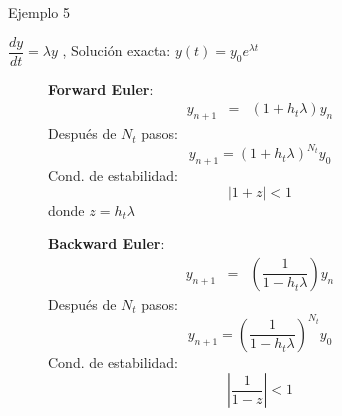 \documentclass{beamer}
\begin{document}
\begin{frame}{Ejemplo 5}

\begin{block}{}
$\dfrac{dy}{dt} = \lambda y$ , Solución exacta: $y(t) = y_0 e^{\lambda t}$
\end{block}
{\small
\begin{figure}[h]
	\begin{minipage}[b]{0.5\linewidth}
	\textbf{Forward Euler}:
	\begin{eqnarray*}
	y_{n+1}& = & (1 + h_t \lambda) y_{n} 
	\end{eqnarray*}
	Después de $N_t$ pasos:
	\begin{displaymath}
	y_{n+1} =  (1 + h_t \lambda)^{N_t} y_{0}
	\end{displaymath}
	Cond. de estabilidad:
	\begin{displaymath}
	|1 + z| < 1
	\end{displaymath}
	donde $z = h_t \lambda$		
	\vspace{0.80cm}
	\end{minipage}
	\begin{minipage}[b]{0.45\linewidth}
	\textbf{Backward Euler}: 
	\begin{eqnarray*}
	y_{n+1}& = & \left(\dfrac{1}{1 - h_t \lambda}\right) y_{n}
	\end{eqnarray*}
	Después de $N_t$ pasos:
	\begin{displaymath}
	y_{n+1} =  \left(\dfrac{1}{1 - h_t \lambda}\right)^{N_t} y_{0}
	\end{displaymath}
	Cond. de estabilidad:
	\begin{displaymath}
	\left|\dfrac{1}{1 - z}\right| < 1
	\end{displaymath}	
	\end{minipage}
\end{figure}
}
\end{frame}


\end{document}
